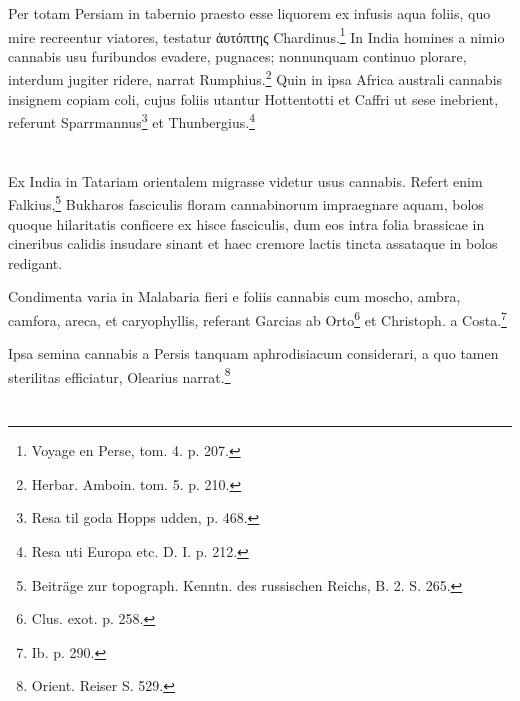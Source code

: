 \documentclass[a4paper, 11pt, oneside, polutonikogreek, german]{article}
\begin{document}
Per totam Persiam in tabernio praesto esse liquorem ex infusis aqua foliis, quo mire recreentur viatores, testatur ἀυτόπτης Chardinus.\footnote{Voyage en Perse, tom. 4. p. 207.} In India homines a nimio cannabis usu furibundos evadere, pugnaces; nonnunquam continuo plorare, interdum jugiter ridere, narrat Rumphius.\footnote{Herbar. Amboin. tom. 5. p. 210.} Quin in ipsa Africa australi cannabis insignem copiam coli, cujus foliis utantur Hottentotti et Caffri ut sese inebrient, referunt Sparrmannus\footnote{Resa til goda Hopps udden, p. 468.} et Thunbergius.\footnote{Resa uti Europa etc. D. I. p. 212.}
\section{}
\paragraph{}
Ex India in Tatariam orientalem migrasse videtur usus cannabis. Refert enim Falkius,\footnote{Beiträge zur topograph. Kenntn. des russischen Reichs, B. 2. S. 265.} Bukharos fasciculis floram cannabinorum impraegnare aquam, bolos quoque hilaritatis conficere ex hisce fasciculis, dum eos intra folia brassicae in cineribus calidis insudare sinant et haec cremore lactis tincta assataque in bolos redigant.

Condimenta varia in Malabaria fieri e foliis cannabis cum moscho, ambra, camfora, areca, et caryophyllis, referant Garcias ab Orto\footnote{Clus. exot. p. 258.} et Christoph. a Costa.\footnote{Ib. p. 290.}

Ipsa semina cannabis a Persis tanquam aphrodisiacum considerari, a quo tamen sterilitas efficiatur, Olearius narrat.\footnote{Orient. Reiser S. 529.}
\section{}
\end{document}
